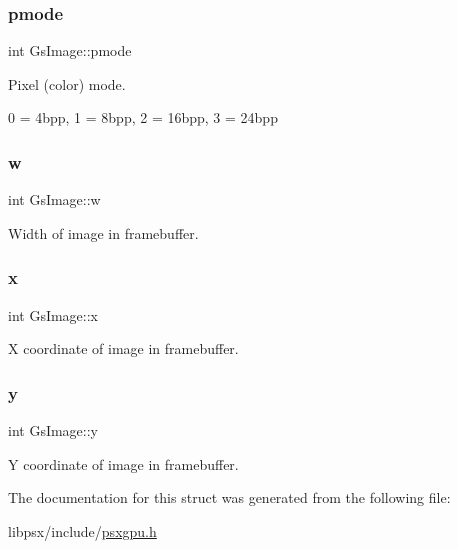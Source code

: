 \subsubsection{\texorpdfstring{pmode}{pmode}}
{\footnotesize\ttfamily int Gs\+Image\+::pmode}



Pixel (color) mode. 

0 = 4bpp, 1 = 8bpp, 2 = 16bpp, 3 = 24bpp \mbox{\label{structGsImage_a9161db2be29ff2caf39a9b8fea7256fc}} 
\subsubsection{\texorpdfstring{w}{w}}
{\footnotesize\ttfamily int Gs\+Image\+::w}



Width of image in framebuffer. 

\mbox{\label{structGsImage_a7f481bb2d04e6d2fcab28a70740a087b}} 
\subsubsection{\texorpdfstring{x}{x}}
{\footnotesize\ttfamily int Gs\+Image\+::x}



X coordinate of image in framebuffer. 

\mbox{\label{structGsImage_abe372808a69fc03db2f832375a28f421}} 
\subsubsection{\texorpdfstring{y}{y}}
{\footnotesize\ttfamily int Gs\+Image\+::y}



Y coordinate of image in framebuffer. 



The documentation for this struct was generated from the following file\+:\begin{DoxyCompactItemize}
\item 
libpsx/include/\hyperlink{psxgpu_8h}{psxgpu.\+h}\end{DoxyCompactItemize}
